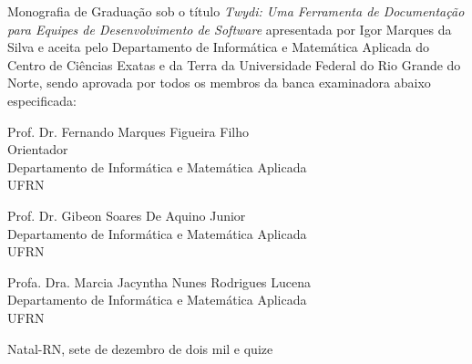 \begin{folhadeaprovacao}
	\setlength{\ABNTsignthickness}{0.4pt}
	\setlength{\ABNTsignwidth}{10cm}

	\noindent
	Monografia de Graduação sob o título \textit{Twydi: Uma Ferramenta de Documentação para Equipes de Desenvolvimento de Software} apresentada por
	Igor Marques da Silva e aceita pelo Departamento de Informática e Matemática Aplicada do
	Centro de Ciências Exatas e da Terra da Universidade Federal do Rio Grande do Norte,
	sendo aprovada por todos os membros da banca examinadora abaixo especificada:

	\assinatura
	{
		Prof. Dr. Fernando Marques Figueira Filho\\
		{\small Orientador} 															\\
		{\footnotesize
			Departamento de Informática e Matemática Aplicada 																	\\
		  	UFRN
		}
	}

	\assinatura
	{
		Prof. Dr. Gibeon Soares De Aquino Junior						 \\
		{\footnotesize
			Departamento de Informática e Matemática Aplicada 																	\\
		  	UFRN
		}
	}

	\assinatura
	{
		Profa. Dra. Marcia Jacyntha Nunes Rodrigues Lucena						 \\
		{\footnotesize
			Departamento de Informática e Matemática Aplicada 																	\\
		  	UFRN
		}
	}

	\vfill

	\begin{center}
		Natal-RN, sete de dezembro de dois mil e quize
	\end{center}
\end{folhadeaprovacao}
